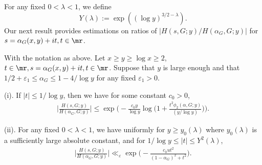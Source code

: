 \documentclass[twoside,leqno,10pt, A4]{amsart}
\begin{document}
  For any fixed $0<\lambda<1$, we define $$Y(\lambda):=\exp ((\log y)^{3/2-\lambda}).$$ 
Our next result provides estimations on ratios of $|H(s,G;y)/H(\alpha_G, G;y)|$ for $s =\alpha_G(x,y)+it, t \in \mr$. 
\begin{lemma}
\label{RS3}
  With the notation as above. Let $x \geq y \geq \log x \geq 2$, $t \in \mr, s =\alpha_G(x,y)+it, t \in \mr$. Suppose that $y$ is large enough and that $1/2+\varepsilon_1 \leq \alpha_G \leq 1-4/\log y$ for any fixed $\varepsilon_1>0$.
  
  (i). If $|t| \leq 1/\log y$, then we have for some constant $c_0>0$, 
\begin{align}
\label{Lrationtsmall}
  \Big |\frac {H(s,G;y)}{ H(\alpha_G,G;y)} \Big | \leq \exp \Big (-\frac {c_0y}{\log y}\log \big(1+\frac {t^2\phi_2(\alpha,G;y)}{(y/\log y)}\big) \Big ).
\end{align}

  (ii). For any fixed $0<\lambda<1$, we have uniformly for
$y \geq y_0(\lambda)$ where $y_0(\lambda)$ is a sufficiently large absolute constant, and for $1/\log y \leq |t| \leq Y^2(\lambda)$,
\begin{align}
\label{Lrationtlarge}
  \Big |\frac {H(s,G;y)}{ H(\alpha_G,G;y)} \Big | \ll_{\varepsilon} \exp \Big (-\frac {c_0ut^2}{(1-\alpha_G)^2+t^2} \Big ). 
\end{align}  
\end{lemma}
\end{document}
